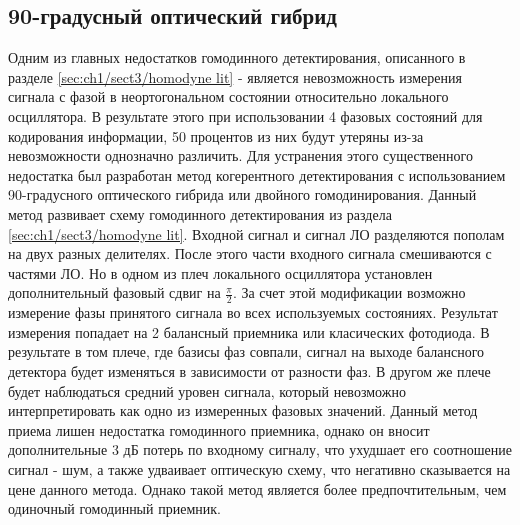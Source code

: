 \subsection{90-градусный оптический гибрид }\label{sec:ch1/sect3/90 hybrid lit}
Одним из главных недостатков гомодинного детектирования, описанного в разделе \ref{sec:ch1/sect3/homodyne lit} - является невозможность измерения сигнала с фазой в неортогональном состоянии относительно локального осциллятора. В результате этого при использовании 4 фазовых состояний для кодирования информации, 50 процентов из них будут утеряны из-за невозможности однозначно различить.
Для устранения этого существенного недостатка был разработан метод когерентного детектирования с использованием 90-градусного оптического гибрида или двойного гомодинирования. Данный метод развивает схему гомодинного детектирования из раздела \ref{sec:ch1/sect3/homodyne lit}. Входной сигнал и сигнал ЛО разделяются пополам на двух разных делителях. После этого части входного сигнала смешиваются с частями ЛО. Но в одном из плеч локального осциллятора установлен дополнительный фазовый сдвиг на $\frac{\pi}{2}$. За счет этой модификации возможно измерение фазы принятого сигнала во всех используемых состояниях. Результат измерения попадает на 2 балансный приемника или класических фотодиода. В результате в том плече, где базисы фаз совпали, сигнал на выходе балансного детектора будет изменяться в зависимости от разности фаз. В другом же плече будет наблюдаться средний уровен сигнала, который невозможно интерпретировать как одно из измеренных фазовых значений. 
Данный метод приема лишен недостатка гомодинного приемника, однако он вносит дополнительные 3 дБ потерь по входному сигналу, что ухудшает его соотношение сигнал - шум, а также удваивает оптическую схему, что негативно сказывается на цене данного метода. Однако такой метод является более предпочтительным, чем одиночный гомодинный приемник. 
